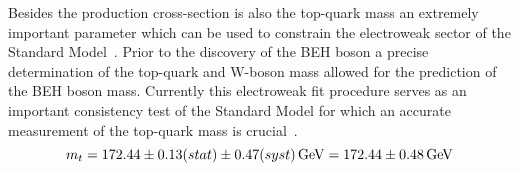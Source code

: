 Besides the production cross-section is also the top-quark mass an extremely important parameter which can be used to constrain the electroweak sector of the Standard Model~\cite{ElectroweakFit}. %
Prior to the discovery of the BEH boson a precise determination of the top-quark and W-boson mass allowed for the prediction of the BEH boson mass. Currently this electroweak fit procedure serves as an important consistency test of the Standard Model for which an accurate measurement of the top-quark mass is crucial~\cite{CMSTopMass}.
\begin{equation}
 m_t = 172.44 \pm 0.13 (stat) \pm 0.47 (syst) \, \mathrm{GeV} = 172.44 \pm 0.48 \, \mathrm{GeV}
\end{equation}

